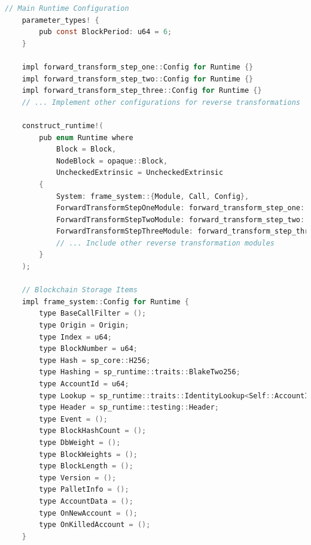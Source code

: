 \documentclass{tufte-handout}
\begin{document}
\begin{lstlisting}[language=C, caption=State Machine]
    // Main Runtime Configuration
    parameter_types! {
        pub const BlockPeriod: u64 = 6;
    }
    
    impl forward_transform_step_one::Config for Runtime {}
    impl forward_transform_step_two::Config for Runtime {}
    impl forward_transform_step_three::Config for Runtime {}
    // ... Implement other configurations for reverse transformations
    
    construct_runtime!(
        pub enum Runtime where
            Block = Block,
            NodeBlock = opaque::Block,
            UncheckedExtrinsic = UncheckedExtrinsic
        {
            System: frame_system::{Module, Call, Config},
            ForwardTransformStepOneModule: forward_transform_step_one::{Module, Call, Storage, Config<T>},
            ForwardTransformStepTwoModule: forward_transform_step_two::{Module, Call, Storage, Config<T>},
            ForwardTransformStepThreeModule: forward_transform_step_three::{Module, Call, Storage, Config<T>},
            // ... Include other reverse transformation modules
        }
    );
    
    // Blockchain Storage Items
    impl frame_system::Config for Runtime {
        type BaseCallFilter = ();
        type Origin = Origin;
        type Index = u64;
        type BlockNumber = u64;
        type Hash = sp_core::H256;
        type Hashing = sp_runtime::traits::BlakeTwo256;
        type AccountId = u64;
        type Lookup = sp_runtime::traits::IdentityLookup<Self::AccountId>;
        type Header = sp_runtime::testing::Header;
        type Event = ();
        type BlockHashCount = ();
        type DbWeight = ();
        type BlockWeights = ();
        type BlockLength = ();
        type Version = ();
        type PalletInfo = ();
        type AccountData = ();
        type OnNewAccount = ();
        type OnKilledAccount = ();
    }
    
\end{lstlisting}
\end{document}
